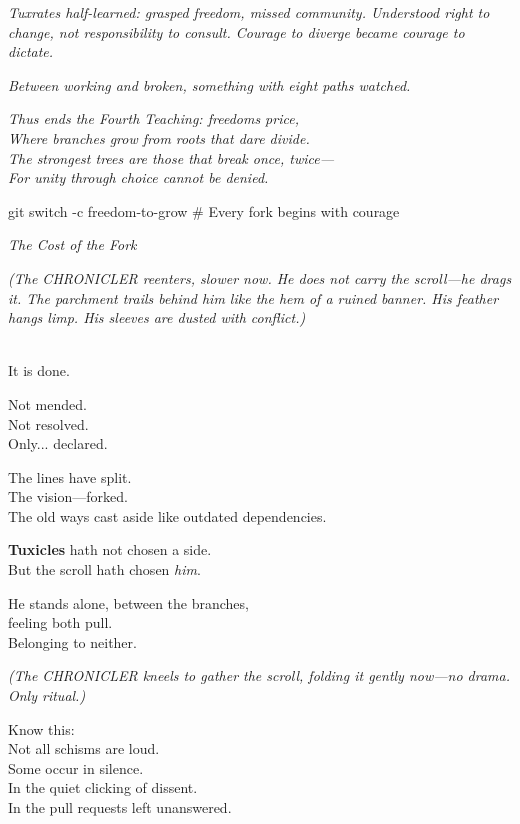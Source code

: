 \emph{Tuxrates half-learned: grasped freedom, missed community. Understood right to change, not responsibility to consult. Courage to diverge became courage to dictate.}

\emph{Between working and broken, something with eight paths watched.}

\bookdivider

\emph{Thus ends the Fourth Teaching: freedom\textquotesingle s price,}\\
\emph{Where branches grow from roots that dare divide.}\\
\emph{The strongest trees are those that break once, twice---}\\
\emph{For unity through choice cannot be denied.}

\begin{codeblock}
git switch -c freedom-to-grow
# Every fork begins with courage
\end{codeblock}

\bookdivider

\label{performing_arts-closing-of-the-scroll}

\emph{The Cost of the Fork}

\emph{(The CHRONICLER reenters, slower now. He does not carry the scroll---he drags it. The parchment trails behind him like the hem of a ruined banner. His feather hangs limp. His sleeves are dusted with conflict.)}

\\
It is done.

Not mended.\\
Not resolved.\\
Only... declared.

The lines have split.\\
The vision---forked.\\
The old ways cast aside like outdated dependencies.

\textbf{Tuxicles} hath not chosen a side.\\
But the scroll hath chosen \emph{him}.

He stands alone, between the branches,\\
feeling both pull.\\
Belonging to neither.

\emph{(The CHRONICLER kneels to gather the scroll, folding it gently now---no drama. Only ritual.)}

Know this:\\
Not all schisms are loud.\\
Some occur in silence.\\
In the quiet clicking of dissent.\\
In the pull requests left unanswered.

